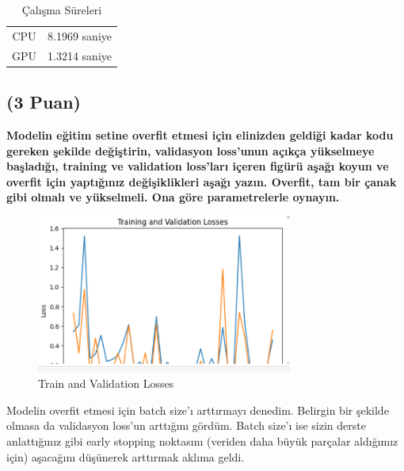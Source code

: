 \documentclass[11pt]{article}
\begin{document}
\begin{table}[ht!]
    \centering
    \caption{Çalışma Süreleri}
    \begin{tabular}{c|c}
        CPU & 8.1969 saniye \\
        GPU & 1.3214 saniye\\
    \end{tabular}
    \label{tab:my_table}
\end{table}

\subsection{(3 Puan)} \textbf{Modelin eğitim setine overfit etmesi için elinizden geldiği kadar kodu gereken şekilde değiştirin, validasyon loss'unun açıkça yükselmeye başladığı, training ve validation loss'ları içeren figürü aşağı koyun ve overfit için yaptığınız değişiklikleri aşağı yazın. Overfit, tam bir çanak gibi olmalı ve yükselmeli. Ona göre parametrelerle oynayın.}


\begin{figure}[ht!]
    \centering
    \includegraphics[width=0.75\textwidth]{losses2.PNG}
    \caption{Train and Validation Losses}
    \label{fig:my_pic}
\end{figure}

Modelin overfit etmesi için batch size'ı arttırmayı denedim. Belirgin bir şekilde olmasa da validasyon loss'un arttığını gördüm. Batch size'ı ise sizin derste anlattığınız gibi early stopping noktasını (veriden daha büyük parçalar aldığımız için) aşacağını düşünerek arttırmak aklıma geldi. 

\end{document}
